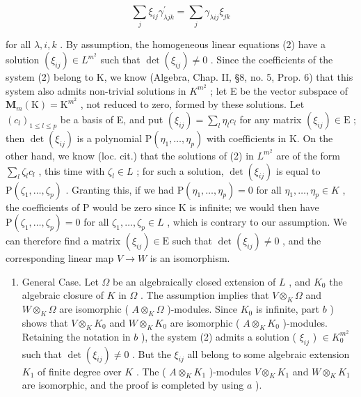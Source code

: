 \[
\sum_ {j} \xi_ {i j} \gamma_ {\lambda j k} ^ {\prime} = \sum_ {j} \gamma_ {\lambda i j} \xi_ {j k}\tag{2}
\]

for all \(\lambda, i, k\) . By assumption, the homogeneous linear equations (2) have a solution \((\xi_{ij}) \in L^{m^2}\) such that \(\det(\xi_{ij}) \neq 0\) . Since the coefficients of the system (2) belong to K, we know (Algebra, Chap. II, §8, no. 5, Prop. 6) that this system also admits non-trivial solutions in \(K^{m^2}\) ; let E be the vector subspace of \(\mathbf{M}_{m}(\mathrm{K})=\mathrm{K}^{m^{2}}\) , not reduced to zero, formed by these solutions. Let \((c_{l})_{1\leqslant l\leqslant p}\) be a basis of E, and put \((\xi_{ij})=\sum_{l}\eta_{l}c_{l}\) for any matrix \((\xi_{ij})\in\mathrm{E}\) ; then \(\det(\xi_{ij})\) is a polynomial \(\mathrm{P}(\eta_{1},\ldots,\eta_{p})\) with coefficients in K. On the other hand, we know (loc. cit.) that the solutions of (2) in \(L^{m^{2}}\) are of the form \(\sum_{l}\zeta_{l}c_{l}\) , this time with \(\zeta_{l}\in L\) ; for such a solution, \(\det(\xi_{ij})\) is equal to \(\mathrm{P}(\zeta_{1},\ldots,\zeta_{p})\) . Granting this, if we had \(\mathrm{P}(\eta_{1},\ldots,\eta_{p})=0\) for all \(\eta_{1},\ldots,\eta_{p}\in K\) , the coefficients of P would be zero since K is infinite; we would then have \(\mathrm{P}(\zeta_{1},\ldots,\zeta_{p})=0\) for all \(\zeta_{1},\ldots,\zeta_{p}\in L\) , which is contrary to our assumption. We can therefore find a matrix \((\xi_{ij})\in\mathrm{E}\) such that \(\det(\xi_{ij})\neq0\) , and the corresponding linear map \(V\to W\) is an isomorphism.

\begin{enumerate}
\def\labelenumi{\alph{enumi})}
\setcounter{enumi}{2}
\tightlist
\item
  General Case. Let \(\Omega\) be an algebraically closed extension of \(L\) , and \(K_0\) the algebraic closure of \(K\) in \(\Omega\) . The assumption implies that \(V \otimes_K \Omega\) and \(W \otimes_K \Omega\) are isomorphic ( \(A \otimes_K \Omega\) )-modules. Since \(K_0\) is infinite, part \(b\) ) shows that \(V \otimes_K K_0\) and \(W \otimes_K K_0\) are isomorphic ( \(A \otimes_K K_0\) )-modules. Retaining the notation in \(b\) ), the system (2) admits a solution ( \(\xi_{ij}\) ) \(\in K_0^{m^2}\) such that \(\det(\xi_{ij}) \neq 0\) . But the \(\xi_{ij}\) all belong to some algebraic extension \(K_1\) of finite degree over \(K\) . The ( \(A \otimes_K K_1\) )-modules \(V \otimes_K K_1\) and \(W \otimes_K K_1\) are isomorphic, and the proof is completed by using \(a\) ).
\end{enumerate}

